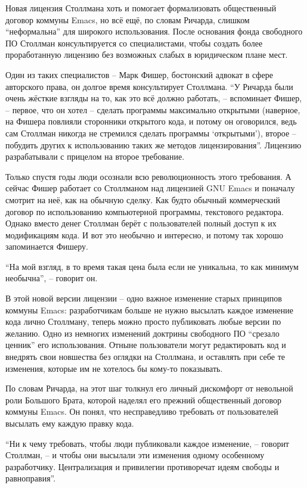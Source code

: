 Новая лицензия Столлмана хоть и помогает формализовать общественный договор коммуны Emacs, но всё ещё, по словам Ричарда, слишком \enquote{неформальна} для широкого использования. После основания фонда свободного ПО Столлман консультируется со специалистами, чтобы создать более проработанную лицензию без возможных слабых в юридическом плане мест.

Один из таких специалистов -- Марк Фишер, бостонский адвокат в сфере авторского права, он долгое время консультирует Столлмана. \enquote{У Ричарда были очень жёсткие взгляды на то, как это всё должно работать, -- вспоминает Фишер, -- первое, что он хотел -- сделать программы максимально открытыми (наверное, на Фишера повлияли сторонники открытого кода, и потому он оговорился, ведь сам Столлман никогда не стремился сделать программы \enquote{открытыми}), второе -- побудить других к использованию таких же методов лицензирования}. Лицензию разрабатывали с прицелом на второе требование.

Только спустя годы люди осознали всю революционность этого требования. А сейчас Фишер работает со Столлманом над лицензией GNU Emacs и поначалу смотрит на неё, как на обычную сделку. Как будто обычный коммерческий договор по использованию компьютерной программы, текстового редактора. Однако вместо денег Столлман берёт с пользователей полный доступ к их модификациям кода. И вот это необычно и интересно, и потому так хорошо запоминается Фишеру.

\enquote{На мой взгляд, в то время такая цена была если не уникальна, то как минимум необычна}, -- говорит он.

В этой новой версии лицензии -- одно важное изменение старых принципов коммуны Emacs: разработчикам больше не нужно высылать каждое изменение кода лично Столлману, теперь можно просто публиковать любые версии по желанию. Одно из немногих изменений доктрины свободного ПО \enquote{срезало ценник} его использования. Отныне пользователи могут редактировать код и внедрять свои новшества без оглядки на Столлмана, и оставлять при себе те изменения, которые им не хотелось бы кому-то показывать.

По словам Ричарда, на этот шаг толкнул его личный дискомфорт от невольной роли Большого Брата, которой наделял его прежний общественный договор коммуны Emacs. Он понял, что несправедливо требовать от пользователей высылать ему каждую правку кода.

\enquote{Ни к чему требовать, чтобы люди публиковали каждое изменение, -- говорит Столлман, -- и чтобы они высылали эти изменения одному особенному разработчику. Централизация и привилегии противоречат идеям свободы и равноправия}.


